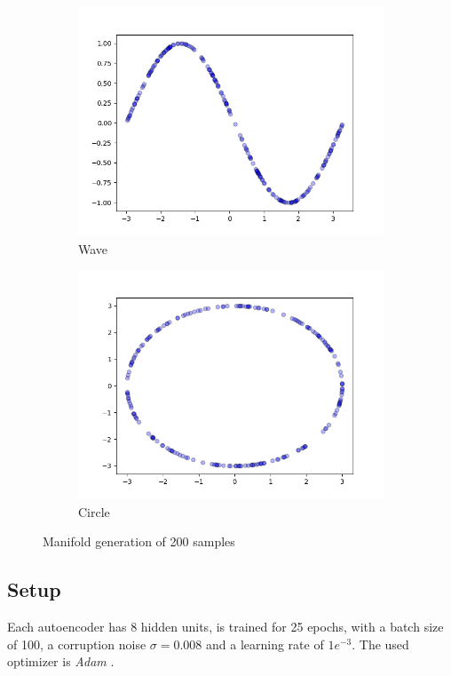 \begin{figure}[!h]
\centering
\begin{subfigure}{.5\textwidth}
  \centering
  \includegraphics[width=.95\linewidth]{figures/wave-manifold}
  \caption{Wave}
\end{subfigure}%
\begin{subfigure}{.5\textwidth}
  \centering
  \includegraphics[width=.95\linewidth]{figures/circle-manifold}
  \caption{Circle}
\end{subfigure}
\caption{Manifold generation of 200 samples}
\label{fig:generate-manifold}
\end{figure}

\subsection*{Setup}
Each autoencoder has 8 hidden units, is trained for 25 epochs, with a batch size of 100, a corruption noise $\sigma = 0.008$ and a learning rate of $1e^{-3}$. The used optimizer is \textit{Adam} \citep{kingma}.


